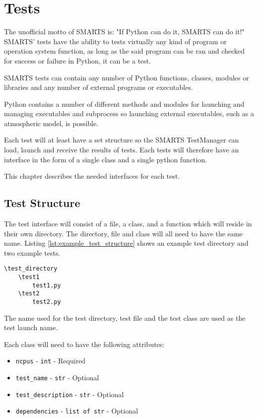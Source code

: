 \chapter{Tests}
\label{chap:tests}

The unofficial motto of SMARTS is: "If Python can do it, SMARTS can do it!"
SMARTS' tests have the ability to tests virtually any kind of program or
operation system function, as long as the said program can be ran and checked
for success or failure in Python, it can be a test.

SMARTS tests can contain any number of Python functions, classes, modules or
libraries and any number of external programs or executables.

Python contains a number of different methods and modules for launching and
managing executables and subprocess so launching external executables, such as
a atmospheric model, is possible. 

Each test will at least have a set structure so the SMARTS TestManager can
load, launch and receive the results of tests. Each tests will therefore have
an interface in the form of a single class and a single python function.

This chapter describes the needed interfaces for each test.

\section{Test Structure}
\label{sec:test_structure}

The test interface will consist of a file, a class, and a function which will
reside in their own directory. The directory, file and class will all need to
have the same name. Listing \ref{lst:example_test_structure} shows an example
test directory and two example tests.

\begin{lstlisting}[language=Clean, 
                   caption={Example Test Structure},
                   label={lst:example_test_structure}]
\test_directory
    \test1
        test1.py
    \test2
        test2.py
\end{lstlisting}

The name used for the test directory, test file and the test class are used as
the test launch name.

Each class will need to have the following attributes:

\begin{itemize}
    \item {\tt ncpus} - {\tt int} - Required 
    \item {\tt test\_name} - {\tt str} - Optional
    \item {\tt test\_description} - {\tt str} - Optional
    \item {\tt dependencies} - {\tt list of str} - Optional
\end{itemize}

